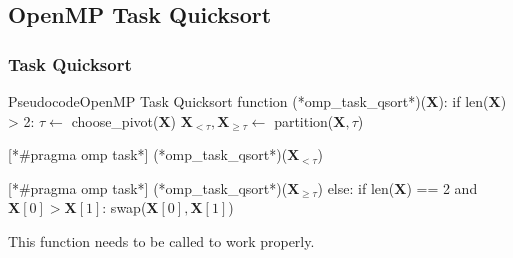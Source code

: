 \documentclass[xcolor=table]{beamer}
\begin{document}
\subsection{OpenMP Task Quicksort}
\begin{frame}[fragile]

\frametitle{Task Quicksort}

\begin{code}{Pseudocode}{OpenMP Task Quicksort}{}{}
function (*omp_task_qsort*)($\mathbf{X}$):
    if len($\mathbf{X}$) > 2:
        $\tau \leftarrow$ choose_pivot($\mathbf{X}$)
        $\mathbf{X}_{< \tau}, \mathbf{X}_{\geq \tau} \leftarrow$ partition($\mathbf{X}, \tau$)

        [*#pragma omp task*]
        (*omp_task_qsort*)($\mathbf{X}_{< \tau}$)

        [*#pragma omp task*]
        (*omp_task_qsort*)($\mathbf{X}_{\geq \tau}$)
    else:
        if len($\mathbf{X}$) == 2 and $\mathbf{X}[0] > \mathbf{X}[1]$:
            swap($\mathbf{X}[0], \mathbf{X}[1]$)
\end{code}

\tiny{ This function needs to be called    to work properly.}
\end{frame}
\end{document}
